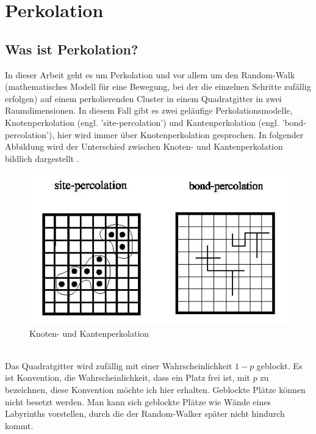 \documentclass[a4paper, 12pt]{report}
\begin{document}
\chapter{Perkolation}
\section{Was ist Perkolation?}
In dieser Arbeit geht es um Perkolation und vor allem um den Random-Walk (mathematisches Modell für eine Bewegung, bei der die einzelnen Schritte zufällig erfolgen) auf einem perkolierenden Cluster in einem Quadratgitter in zwei Raumdimensionen. In diesem Fall gibt es zwei geläufige Perkolationsmodelle, Knotenperkolation (engl. 'site-percolation') und Kantenperkolation (engl. 'bond-percolation'), hier wird immer über Knotenperkolation gesprochen. In folgender Abbildung wird der Unterschied zwischen Knoten- und Kantenperkolation bildlich dargestellt \cite{Wiki_Perkolationstheorie}.
\begin{figure}[h!]
	\centering
	\includegraphics[scale=0.6]{Percolation1.jpg}
	\caption{Knoten- und Kantenperkolation}
\end{figure}
\vspace{0,5cm}
\\
Das Quadratgitter wird zufällig mit einer Wahrscheinlichkeit $1-p$ geblockt. Es ist Konvention, die Wahrscheinlichkeit, dass ein Platz frei ist, mit $p$ zu bezeichnen, diese Konvention möchte ich hier erhalten. Geblockte Plätze können nicht besetzt werden. Man kann sich geblockte Plätze wie Wände eines Labyrinths vorstellen, durch die der Random-Walker später nicht hindurch kommt.  
\\
\end{document}
